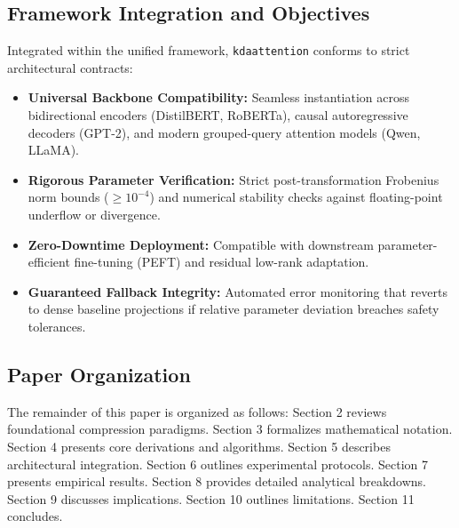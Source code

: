 \subsection{Framework Integration and Objectives}
Integrated within the unified framework, \texttt{kdaattention} conforms to strict architectural contracts:
\begin{itemize}
\item \textbf{Universal Backbone Compatibility:} Seamless instantiation across bidirectional encoders (DistilBERT, RoBERTa), causal autoregressive decoders (GPT-2), and modern grouped-query attention models (Qwen, LLaMA).
\item \textbf{Rigorous Parameter Verification:} Strict post-transformation Frobenius norm bounds ($\ge 10^{-4}$) and numerical stability checks against floating-point underflow or divergence.
\item \textbf{Zero-Downtime Deployment:} Compatible with downstream parameter-efficient fine-tuning (PEFT) and residual low-rank adaptation.
\item \textbf{Guaranteed Fallback Integrity:} Automated error monitoring that reverts to dense baseline projections if relative parameter deviation breaches safety tolerances.
\end{itemize}

\subsection{Paper Organization}
The remainder of this paper is organized as follows: Section 2 reviews foundational compression paradigms. Section 3 formalizes mathematical notation. Section 4 presents core derivations and algorithms. Section 5 describes architectural integration. Section 6 outlines experimental protocols. Section 7 presents empirical results. Section 8 provides detailed analytical breakdowns. Section 9 discusses implications. Section 10 outlines limitations. Section 11 concludes.
